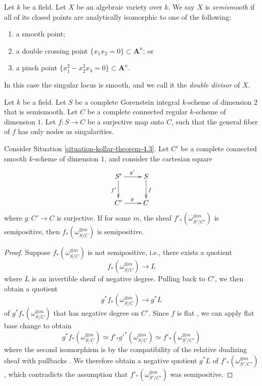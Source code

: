 \begin{definition}[cf.\ {\cite[Definition 4.1(i)]{Ko90}}]
\label{definition-semismooth}
Let $k$ be a field.
Let $X$ be an algebraic variety over $k$.
We say $X$ is {\it semismooth} if all of its closed points are analytically
isomorphic to one of the following:
\begin{enumerate}
\item a smooth point;
\item a double crossing point $\{x_1x_2 = 0\} \subset \mathbf{A}^n$; or
\item a pinch point $\{x_1^2 - x_2^2x_3 = 0\} \subset \mathbf{A}^n$.
\end{enumerate}
In this case the singular locus is smooth, and we call it the {\it double
divisor} of $X$.
\end{definition}

\begin{situation}
\label{situation-kollar-theorem-4.3}
Let $k$ be a field.
Let $S$ be a complete Gorenstein integral $k$-scheme of dimension $2$ that is
semismooth.
Let $C$ be a complete connected regular $k$-scheme of dimension $1$.
Let $f : S \to C$ be a surjective map onto $C$, such that the general fiber of
$f$ has only nodes as singularities.
\end{situation}

\begin{lemma}
\label{lemma-base-change-okay}
Consider Situation \ref{situation-kollar-theorem-4.3}.
Let $C'$ be a complete connected smooth $k$-scheme of dimension $1$, and
consider the cartesian square
$$
\xymatrix{
S' \ar[d]_{f'}\ar[r]^{g'} & S\ar[d]^f\\
C' \ar[r]^g & C
}
$$
where $g: C' \to C$ is surjective.
If for some $m$, the sheaf $f'_*(\omega_{S'/C'}^{\otimes m})$ is semipositive,
then $f_*(\omega_{S/C}^{\otimes m})$ is semipositive.
\end{lemma}
\begin{proof}
Suppose $f_*(\omega_{S/C}^{\otimes m})$ is not semipositive, i.e., there
exists a quotient
$$f_*(\omega_{S/C}^{\otimes m}) \longrightarrow L$$
where $L$ is an invertible sheaf of negative degree.
Pulling back to $C'$, we then obtain a quotient
$$g^*f_*(\omega_{S/C}^{\otimes m}) \longrightarrow g^*L$$
of $g^*f_*(\omega_{S/C}^{\otimes m})$ that has negative degree on $C'$.
Since $f$ is flat \cite[\href{http://stacks.math.columbia.edu/tag/00R4}{Tag
00R4}]{stacks-project}, we can apply flat base change
\cite[\href{http://stacks.math.columbia.edu/tag/02KH}{Tag 02KH}]{stacks-project}
to obtain
$$
g^*f_*(\omega_{S/C}^{\otimes m})
\simeq f'_*g'^*(\omega_{S/C}^{\otimes m})
\simeq f'_*(\omega_{S'/C'}^{\otimes m})
$$
where the second isomorphism is
by the compatibility of the relative dualizing sheaf with pullbacks
\cite[\href{http://stacks.math.columbia.edu/tag/0E4P}{Tag
0E4P}]{stacks-project}.
We therefore obtain a negative quotient $g^*L$ of $f'_*(\omega_{S'/C'}^{\otimes
m})$, which contradicts the assumption that $f'_*(\omega_{S'/C'}^{\otimes m})$
was semipositive.
\end{proof}

